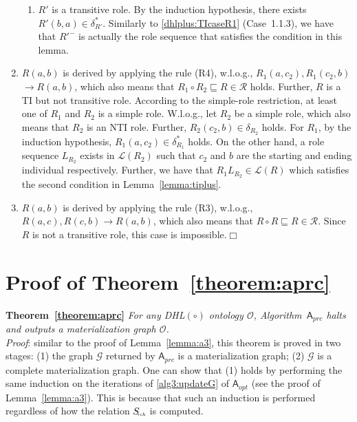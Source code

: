 \begin{enumerate}[leftmargin=12ex,label=Case~3.\arabic*, ref=Case~3.\arabic*]
\begin{enumerate}[leftmargin=8ex,label=Case~3.2.\arabic*]
     \item $R'$ is a transitive role.
        By the induction hypothesis, there exists $R'(b,a)\in\delta^*_{R'}$.
        Similarly to \ref{dhlplus:TIcaseR1} (Case~1.1.3), we have that
        $R'^-$ is actually the role sequence that satisfies the condition
        in this lemma.
    \end{enumerate}

\item $R(a,b)$ is derived by applying the rule (R4), w.l.o.g.,
    $R_1(a,c_2),R_1(c_2,b)$ $\rightarrow R(a,b)$,
    which also means that $R_1\circ R_2\sqsubseteq R\in\mathcal{R}$ holds.
    Further, $R$ is a TI but not transitive role. According to the simple-role restriction,
    at least one of $R_1$ and $R_2$ is a simple role.
    W.l.o.g., let $R_2$ be a simple role, which also
    means that $R_2$ is an NTI role. Further, $R_2(c_2,b)\in\delta_{R_2}$ holds.
    For $R_1$, by the induction hypothesis, $R_1(a,c_2)\in\delta^*_{R_1}$ holds.
    On the other hand, a role sequence $L_{R_2}$ exists in $\mathcal{L}(R_2)$ such that $c_2$ and $b$
    are the starting and ending individual respectively.
    Further, we have that $R_1L_{R_2}\in\mathcal{L}(R)$ which satisfies the second condition
    in Lemma~\ref{lemma:tiplus}.\label{dhlplus:TIcaseR4}

\item $R(a,b)$ is derived by applying the rule (R3), w.l.o.g., $R(a,c),R(c,b)\rightarrow R(a,b)$,
    which also means that $R\circ R\sqsubseteq R\in\mathcal{R}$.
    Since $R$ is not a transitive role, this case is impossible.\hfill$\Box$
\end{enumerate}

\section{Proof of Theorem~\ref{theorem:aprc}}

\textbf{Theorem~\ref{theorem:aprc}}
\emph{For any DHL$(\circ)$ ontology $\mathcal{O}$, Algorithm~$\mathsf{A}_{prc}$ halts and outputs
a materialization graph $\mathcal{O}$.}\\

\noindent\emph{Proof}: similar to the proof of Lemma~\ref{lemma:a3},
this theorem is proved in two stages:
(1) the graph $\mathcal{G}$ returned by $\mathsf{A}_{prc}$ is a materialization graph;
(2) $\mathcal{G}$ is a complete materialization graph.
One can show that (1) holds by performing the same induction on the iterations of \ref{alg3:updateG} of $\mathsf{A}_{opt}$
(see the proof of Lemma~\ref{lemma:a3}). This is because that
such an induction is performed regardless of how the relation $S_{\textit{\!\tiny rch}}$ is computed.

